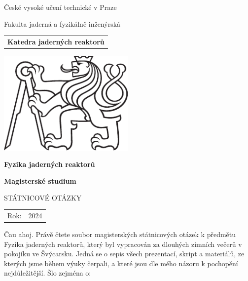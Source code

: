 \documentclass[a4paper, 11pt]{article}
\newcommand{\logoCVUT}{\includegraphics[width = 0.5\textwidth]{img/symbol_cvut_konturova_verze_cb.pdf}}
\begin{document}
% 
% 

\thispagestyle{empty}

\begin{center}
	{\LARGE
		České vysoké učení technické v Praze \par
		Fakulta jaderná a fyzikálně inženýrská
	}
    \vspace{10mm}

    \begin{tabular}{c}
		\textbf{Katedra jaderných reaktorů} \\[3pt]
    \end{tabular}

   \vspace{10mm} \logoCVUT \vspace{15mm}

   {\huge \textbf{Fyzika jaderných reaktorů}\par}
   \vspace{5mm}
   {\huge \textbf{Magisterské studium}\par}

   \vspace{15mm}
   {\Large \MakeUppercase{Státnicové otázky}}

   \vfill
   {\large
    \begin{tabular}{ll}
    Rok: & 2024
    \end{tabular}
   }
\end{center}

\newpage
\thispagestyle{empty}

\vfill

\vspace{1em}
Čau ahoj. Právě čtete soubor magisterských státnicových otázek k předmětu Fyzika jaderných reaktorů, který byl vypracován za dlouhých zimních večerů v pokojíku ve Švýcarsku. Jedná se o sepis všech prezentací, skript a materiálů, ze kterých jsme během výuky čerpali, a které jsou dle mého názoru k pochopění nejdůležitější. Šlo zejména o:
\end{document}
